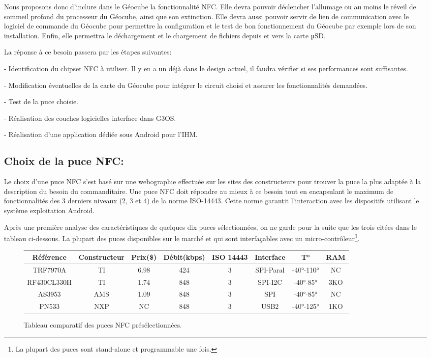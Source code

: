 \documentclass{themeensg}
\begin{document}
Nous proposons donc d’inclure dans le Géocube la fonctionnalité NFC. Elle devra pouvoir déclencher l’allumage ou au moins le réveil de sommeil profond du processeur du Géocube, ainsi que son extinction. Elle devra aussi pouvoir servir de lien de communication avec le logiciel de commande du Géocube pour permettre la configuration et le test de bon fonctionnement du Géocube par exemple lors de son installation. Enfin, elle permettra le déchargement et le chargement de fichiers depuis et vers la carte µSD.

La réponse à ce besoin passera par les étapes suivantes:

- Identification du chipset NFC à utiliser. Il y en a un déjà dans le design actuel, il faudra vérifier si ses performances sont suffisantes.

- Modification éventuelles de la carte du Géocube pour intégrer le circuit choisi et assurer les fonctionnalités demandées.

- Test de la puce choisie.

- Réalisation des couches logicielles interface dans G3OS.

- Réalisation d’une application dédiée sous Android pour l’IHM.


\subsection{Choix de la puce NFC:}
Le choix d'une puce NFC s'est basé sur une webographie effectuée sur les sites des constructeurs pour trouver la puce la plus adaptée à la description du besoin du commanditaire. Une puce NFC doit répondre au mieux à ce besoin tout en encapsulant le maximum de fonctionnalités des 3 derniers niveaux (2, 3 et 4) de la norme ISO-14443. Cette norme garantit l'interaction avec les dispositifs utilisant le système exploitation Android.

Après une première analyse des caractéristiques de quelques dix puces sélectionnées, on ne garde pour la suite que les trois citées dans le tableau ci-dessous. La plupart des puces disponibles sur le marché et qui sont interfaçables avec un micro-contrôleur\footnote{La plupart des puces sont stand-alone et programmable une fois.}.
\begin{figure}
\begin{center}
\begin{tabular}{|c|c|c|c|c|c|c|c|}
\hline
Référence & Constructeur & Prix(\$) & Débit(kbps) & ISO 14443 & Interface & T° & RAM\\ \hline
TRF7970A & TI & 6.98 & 424 & 3 & SPI-Paral & -40°-110° & NC\\
RF430CL330H & TI & 1.74 & 848 & 3 & SPI-I2C & -40°-85° & 3KO\\
AS3953 & AMS & 1.09 & 848 & 3 & SPI & -40°-85° & NC\\
PN533 & NXP & NC & 848 & 3 & USB2 & -40°-125° & 1KO\\
\hline
\end{tabular}
\end{center}
\caption{Tableau comparatif des puces NFC présélectionnées.}
\end{figure}
\end{document}
